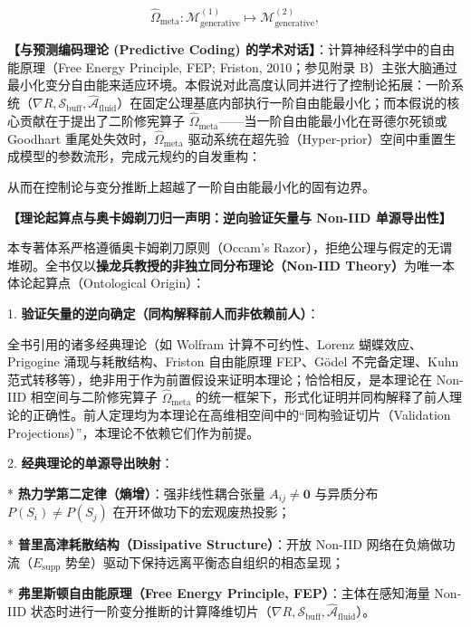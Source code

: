 \documentclass[11pt,a4paper,oneside]{ctexart}
\begin{document}
\begin{equation}
\hat{\Omega}_{\text{meta}}: \mathcal{M}_{\text{generative}}^{(1)} \mapsto \mathcal{M}_{\text{generative}}^{(2)},
\end{equation}
\begin{notebox}
\textbf{【与预测编码理论 (Predictive Coding) 的学术对话】}：计算神经科学中的自由能原理（Free Energy Principle, FEP; Friston, 2010；参见附录 B）主张大脑通过最小化变分自由能来适应环境。本假说对此高度认同并进行了控制论拓展：一阶系统（$\nabla R, \mathcal{S}_{\text{buff}}, \hat{\mathcal{A}}_{\text{fluid}}$）在固定公理基底内部执行一阶自由能最小化；而本假说的核心贡献在于提出了\textit{}二阶修宪算子 $\hat{\Omega}_{\text{meta}}$\textit{}------当一阶自由能最小化在哥德尔死锁或 Goodhart 重尾处失效时，$\hat{\Omega}_{\text{meta}}$ 驱动系统在超先验（Hyper-prior）空间中重置生成模型的参数流形，完成元规约的自发重构：

从而在控制论与变分推断上超越了一阶自由能最小化的固有边界。
\end{notebox}



\begin{notebox}
[!IMPORTANT]

\textbf{【理论起算点与奥卡姆剃刀归一声明：逆向验证矢量与 Non-IID 单源导出性】}

本专著体系严格遵循奥卡姆剃刀原则（Occam's Razor），拒绝公理与假定的无谓堆砌。全书仅以\textbf{操龙兵教授的非独立同分布理论（Non-IID Theory）}为唯一本体论起算点（Ontological Origin）：

1. \textbf{验证矢量的逆向确定（同构解释前人而非依赖前人）}：

全书引用的诸多经典理论（如 Wolfram 计算不可约性、Lorenz 蝴蝶效应、Prigogine 涌现与耗散结构、Friston 自由能原理 FEP、Gödel 不完备定理、Kuhn 范式转移等），\textit{}绝非用于作为前置假设来证明本理论；恰恰相反，是本理论在 Non-IID 相空间与二阶修宪算子 $\hat{\Omega}_{\text{meta}}$ 的统一框架下，形式化证明并同构解释了前人理论的正确性\textit{}。前人定理均为本理论在高维相空间中的“同构验证切片（Validation Projections）”，本理论不依赖它们作为前提。

2. \textbf{经典理论的单源导出映射}：

* \textbf{热力学第二定律（熵增）}：强非线性耦合张量 $A_{ij} \neq \mathbf{0}$ 与异质分布 $P(S_i) \neq P(S_j)$ 在开环做功下的宏观废热投影；

* \textbf{普里高津耗散结构（Dissipative Structure）}：开放 Non-IID 网络在负熵做功流（$E_{\text{supp}}$ 势垒）驱动下保持远离平衡态自组织的相态呈现；

* \textbf{弗里斯顿自由能原理（Free Energy Principle, FEP）}：主体在感知海量 Non-IID 状态时进行一阶变分推断的计算降维切片（$\nabla R, \mathcal{S}_{\text{buff}}, \hat{\mathcal{A}}_{\text{fluid}}$）。
\end{notebox}
\end{document}
